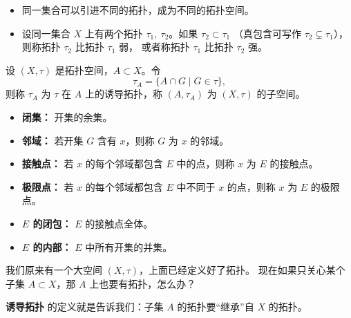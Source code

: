 \begin{itemize}
  \item 同一集合可以引进不同的拓扑，成为不同的拓扑空间。
  \item 设同一集合 $X$ 上有两个拓扑 $\tau_1,\ \tau_2$。如果 $\tau_2\subset \tau_1$
  （真包含可写作 $\tau_2\subsetneq \tau_1$），则称拓扑 $\tau_2$ 比拓扑 $\tau_1$ 弱，
  或者称拓扑 $\tau_1$ 比拓扑 $\tau_2$ 强。
\end{itemize}
\begin{proposition}[诱导拓扑与基本概念]
设 $(X,\tau)$ 是拓扑空间，$A\subset X$。令
\[
\tau_A = \{ A\cap G \mid G\in \tau \},
\]
则称 $\tau_A$ 为 $\tau$ 在 $A$ 上的诱导拓扑，称 $(A,\tau_A)$ 为 $(X,\tau)$ 的子空间。

\begin{itemize}
  \item \textbf{闭集：} 开集的余集。
  \item \textbf{邻域：} 若开集 $G$ 含有 $x$，则称 $G$ 为 $x$ 的邻域。
  \item \textbf{接触点：} 若 $x$ 的每个邻域都包含 $E$ 中的点，则称 $x$ 为 $E$ 的接触点。
  \item \textbf{极限点：} 若 $x$ 的每个邻域都包含 $E$ 中不同于 $x$ 的点，则称 $x$ 为 $E$ 的极限点。
  \item \textbf{$E$ 的闭包：} $E$ 的接触点全体。
  \item \textbf{$E$ 的内部：} $E$ 中所有开集的并集。
\end{itemize}
\end{proposition}
我们原来有一个大空间 $(X,\tau)$，上面已经定义好了拓扑。
现在如果只关心某个子集 $A\subset X$，那 $A$ 上也要有拓扑，怎么办？

\medskip
\noindent
\textbf{诱导拓扑} 的定义就是告诉我们：子集 $A$ 的拓扑要“继承”自 $X$ 的拓扑。

